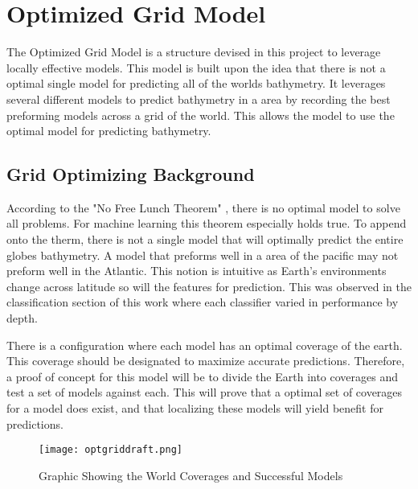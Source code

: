 \section{Optimized Grid Model}
\setlength{\parindent}{10ex}
The Optimized Grid Model is a structure devised in this project to leverage locally effective models.
This model is built upon the idea that there is not a optimal single model for predicting all of the worlds bathymetry.
It leverages several different models to predict bathymetry in a area by recording the best preforming models across a grid of the world.
This allows the model to use the optimal model for predicting bathymetry.

\subsection{Grid Optimizing Background}
According to the "No Free Lunch Theorem" \cite{wolpert1997no}, there is no optimal model to solve all problems.
For machine learning this theorem especially holds true.
To append onto the therm, there is not a single model that will optimally predict the entire globes bathymetry.
A model that preforms well in a area of the pacific may not preform well in the Atlantic.
This notion is intuitive as Earth's environments change across latitude so will the features for prediction.
This was observed in the classification section of this work where each classifier varied in performance by depth.

\par
There is a configuration where each model has an optimal coverage of the earth.
This coverage should be designated to maximize accurate predictions.
Therefore, a proof of concept for this model will be to divide the Earth into coverages and test a set of models against each.
This will prove that a optimal set of coverages for a model does exist, and that localizing these models will yield benefit for predictions.

\begin{figure}[h]
    \centering
    \texttt{[image: optgriddraft.png]}
    \caption{Graphic Showing the World Coverages and Successful Models}
    \label{fig:coveragegrid}
\end{figure}


